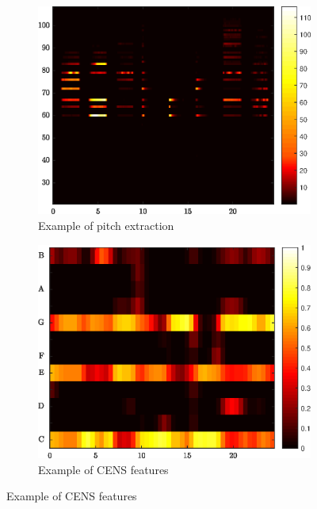 \begin{figure}[t]
	\hfill
	\begin{subfigure}[b]{.45\linewidth}
		\centering
		\includegraphics[width=0.7\linewidth]{img/PitchExample}
		\caption{Example of pitch extraction}
		\label{fig:PitchExample}
	\end{subfigure}
	\hfill
	\begin{subfigure}[b]{.45\linewidth}
		\centering
		\includegraphics[width=0.7\linewidth]{img/CENSexample}
		\caption{Example of CENS features}
		\label{fig:CENSexample}
	\end{subfigure}
	\hfill
\end{figure}
